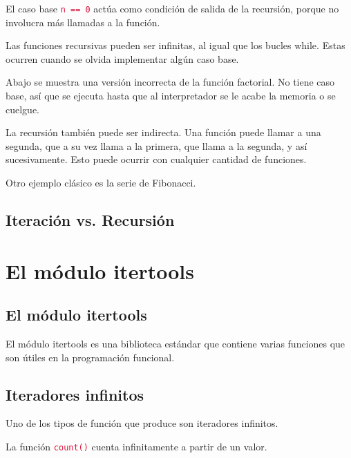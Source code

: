 \documentclass{report}
\newcommand{\ttt}[1]{
  \textcolor{Crimson}{\texttt{#1}}
}
\begin{document}

El caso base \ttt{n == 0} actúa como condición de salida de la recursión, porque no involucra más llamadas a la función.\smallskip

Las funciones recursivas pueden ser infinitas, al igual que los bucles while. Estas ocurren cuando se olvida implementar algún caso base.\smallskip

Abajo se muestra una versión incorrecta de la función factorial. No tiene caso base, así que se ejecuta hasta que al interpretador se le acabe la memoria o se cuelgue.


La recursión también puede ser indirecta. Una función puede llamar a una segunda, que a su vez llama a la primera, que llama a la segunda, y así sucesivamente. Esto puede ocurrir con cualquier cantidad de funciones.


Otro ejemplo clásico es la serie de Fibonacci.


\section{Iteración vs. Recursión}

\clearpage\chapter{El módulo itertools}

\section{El módulo itertools}

El módulo itertools es una biblioteca estándar que contiene varias funciones que son útiles en la programación funcional.


\section{Iteradores infinitos}

Uno de los tipos de función que produce son iteradores infinitos.\smallskip

La función \ttt{count()} cuenta infinitamente a partir de un valor.
\end{document}

